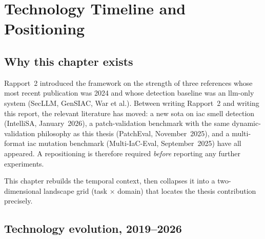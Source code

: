 \documentclass[12pt, a4paper]{report}
\begin{document}
\printglossary[type=\acronymtype, title=List of Acronyms]

\chapter{Technology Timeline and Positioning}
\label{chap:timeline}

\section{Why this chapter exists}

Rapport~2 introduced the framework on the strength of three references whose
most recent publication was 2024 and whose detection baseline was an
\gls{llm}-only system (SecLLM, GenSIAC, War et al.). Between writing
Rapport~2 and writing this report, the relevant literature has moved: a new
\gls{sota} on \gls{iac} smell detection (IntelliSA, January~2026), a
patch-validation benchmark with the same dynamic-validation philosophy as
this thesis (PatchEval, November~2025), and a multi-format \gls{iac}
mutation benchmark (Multi-IaC-Eval, September~2025) have all appeared.
A repositioning is therefore required \emph{before} reporting any further
experiments.

This chapter rebuilds the temporal context, then collapses it into a
two-dimensional landscape grid (task $\times$ domain) that locates the thesis
contribution precisely.

\section{Technology evolution, 2019--2026}
\end{document}
